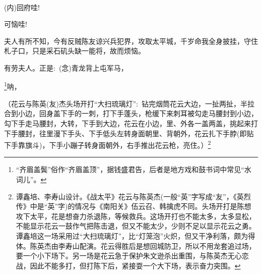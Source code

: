 \newpage\hspace{30pt}~

{%

\subsubsection{\large{}}

{\vspace{5pt}}

{({\akai 内})回府哇!}\hspace{20pt}~

{可恼哇!}\hspace{30pt}~

{夫人有所不知，今有反贼}陈友谅兴兵犯界，攻取太平城，千岁命我全身披挂，守住札子口，只是采石矶头缺一能将，故而烦恼。

有劳夫人。正是:~({\akai 念})青龙背上屯军马，

\footnote{``齐眉盖鬓''俗作``齐眉盖顶''，据钱盛君告，后者是地方戏和鼓书词中常见``水词儿''。}{呐，}




{\vspace{5pt}}


（{花云与陈英(友)杰头场开打``大扫琉璃灯''}:~钻完烟筒花云大边，一扯两扯，半拉合到小边，回身盖下手的一刺，打下手蓬头，枪缓下来刺耳被勾走马腰封到小边，勾下手走马腰封，大转，下手到大边，花云在小边，里、外各一盖两盖，挑起来打下手腰封，往里漫下手头、下手低头左转身面朝里、背朝外，花云扎下手脖(即贴下手靠旗斗)，下手小蹦子转身面朝外，右手推出花云枪，亮住。）\footnote{谭鑫培、李寿山设计。《战太平》花云与陈英杰(一般``英''字写成``友''，《英烈传》中是``英''字)的情况与《南阳关》伍云召、韩擒虎不同。头场开打是陈想攻下太平，花是想奋力杀退陈，等候救兵。这场开打也不能太多，太多显松，不能显示花云一鼓作气把陈击退，但又不能太少，少则不足以显示花云之勇。谭鑫培这一场采用过``大扫琉璃灯''，比``灯笼泡''火炽，但又干净利落，颇为得体。陈英杰由李寿山配演。花云得胜后是想回城防卫，所以不用龙套追过场，要一个小下场下。另一场是花云急于保护朱文逊杀出重围，与陈英杰无心恋战，因此不能多打，但打陈下后，紧接耍一个大下场，表示奋力突围。}

}
